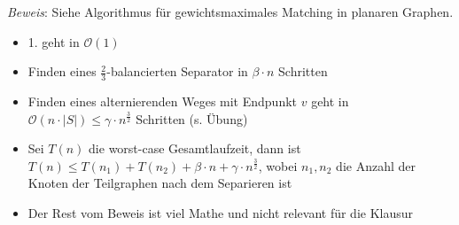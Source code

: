 \textit{Beweis}: Siehe Algorithmus für gewichtsmaximales Matching in planaren Graphen.
\begin{itemize}
	\item 1. geht in $\mathcal{O}(1)$
	\item Finden eines $\frac{2}{3}$-balancierten Separator in $\beta \cdot n$ Schritten
	\item Finden eines alternierenden Weges mit Endpunkt $v$ geht in $\mathcal{O}(n\cdot |S|)\leq \gamma\cdot n^{\frac{3}{2}}$ Schritten (s. Übung)
	\item Sei $T(n)$ die worst-case Gesamtlaufzeit, dann ist $T(n)\leq T(n_1)+T(n_2)+\beta\cdot n+\gamma\cdot n^{\frac{3}{2}}$, wobei $n_1,n_2$ die Anzahl der Knoten der Teilgraphen nach dem Separieren ist
	\item Der Rest vom Beweis ist viel Mathe und nicht relevant für die Klausur
\end{itemize}